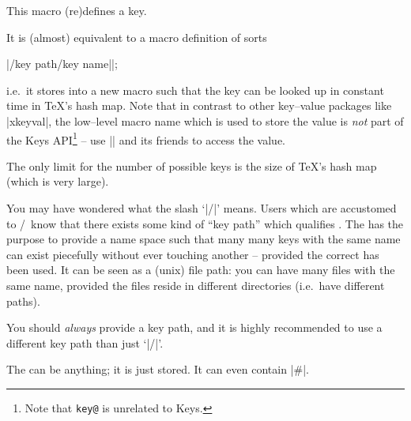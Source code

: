 \documentclass[a4paper]{ltxdoc}
\begin{document}
\begin{command}{\pgfkeyssetvalue{}}
	This macro (re)defines a key. 
	
	It is (almost) equivalent to a macro definition of sorts

|\expandafter\def\csname key@|\meta{/key path/key name}|\endcsname|;

	i.e.\ it stores  into a new macro such that the key can be looked up in constant time in \TeX's hash map. 
	Note that in contrast to other key--value packages like |xkeyval|, the low--level macro name which is used to store the value is \emph{not} part of the \PGF Keys API\footnote{Note that \texttt{key@} is unrelated to \PGF Keys.} -- use |\pgfkeysgetvalue| and its friends to access the value.

	The only limit for the number of possible keys is the size of \TeX's hash map (which is very large).

	You may have wondered what the slash `|/|' means. Users which are accustomed to \PGF/\PGFPlots\ know that there exists some kind of ``key path'' which qualifies . The  has the purpose to provide a name space such that many many keys with the same name can exist piecefully without ever touching another -- provided the correct  has been used. It can be seen as a (unix) file path: you can have many files with the same name, provided the files reside in different directories (i.e.\ have different paths).

	You should \emph{always} provide a key path, and it is highly recommended to use a different key path than just `|/|'.

	The  can be anything; it is just stored. It can even contain |#|.
\end{command}
\end{document}
